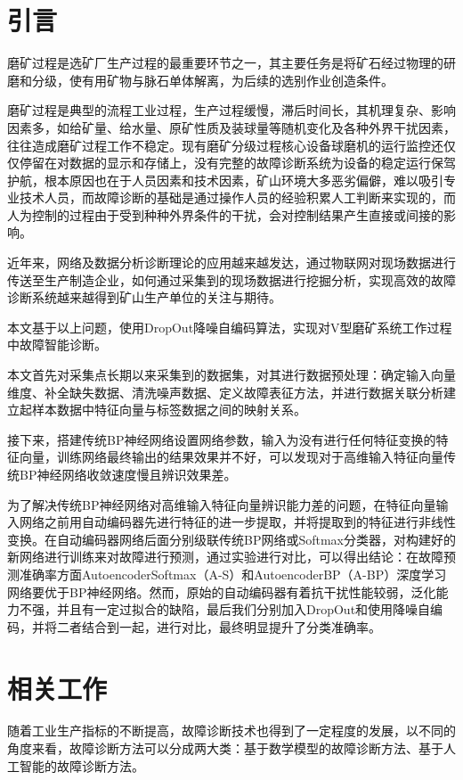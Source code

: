 \documentclass{ctacn}%
\begin{document}
\begin{multicols}{2}
\section{引\quad 言}
磨矿过程是选矿厂生产过程的最重要环节之一，其主要任务是将矿石经过物理的研磨和分级，使有用矿物与脉石单体解离，为后续的选别作业创造条件。

磨矿过程是典型的流程工业过程，生产过程缓慢，滞后时间长，其机理复杂、影响因素多，如给矿量、给水量、原矿性质及装球量等随机变化及各种外界干扰因素，往往造成磨矿过程工作不稳定。现有磨矿分级过程核心设备球磨机的运行监控还仅仅停留在对数据的显示和存储上，没有完整的故障诊断系统为设备的稳定运行保驾护航，根本原因也在于人员因素和技术因素，矿山环境大多恶劣偏僻，难以吸引专业技术人员，而故障诊断的基础是通过操作人员的经验积累人工判断来实现的，而人为控制的过程由于受到种种外界条件的干扰，会对控制结果产生直接或间接的影响。

近年来，网络及数据分析诊断理论的应用越来越发达，通过物联网对现场数据进行传送至生产制造企业，如何通过采集到的现场数据进行挖掘分析，实现高效的故障诊断系统越来越得到矿山生产单位的关注与期待。

本文基于以上问题，使用DropOut降噪自编码算法，实现对V型磨矿系统工作过程中故障智能诊断。

本文首先对采集点长期以来采集到的数据集，对其进行数据预处理：确定输入向量维度、补全缺失数据、清洗噪声数据、定义故障表征方法，并进行数据关联分析建立起样本数据中特征向量与标签数据之间的映射关系。

接下来，搭建传统BP神经网络设置网络参数，输入为没有进行任何特征变换的特征向量，训练网络最终输出的结果效果并不好，可以发现对于高维输入特征向量传统BP神经网络收敛速度慢且辨识效果差。

为了解决传统BP神经网络对高维输入特征向量辨识能力差的问题，在特征向量输入网络之前用自动编码器先进行特征的进一步提取，并将提取到的特征进行非线性变换。在自动编码器网络后面分别级联传统BP网络或Softmax分类器，对构建好的新网络进行训练来对故障进行预测，通过实验进行对比，可以得出结论：在故障预测准确率方面AutoencoderSoftmax（A-S）和AutoencoderBP（A-BP）深度学习网络要优于BP神经网络。然而，原始的自动编码器有着抗干扰性能较弱，泛化能力不强，并且有一定过拟合的缺陷，最后我们分别加入DropOut和使用降噪自编码，并将二者结合到一起，进行对比，最终明显提升了分类准确率。

\section{相关工作}
随着工业生产指标的不断提高，故障诊断技术也得到了一定程度的发展，以不同的角度来看，故障诊断方法可以分成两大类：基于数学模型的故障诊断方法、基于人工智能的故障诊断方法。


\end{multicols}
\end{document}
